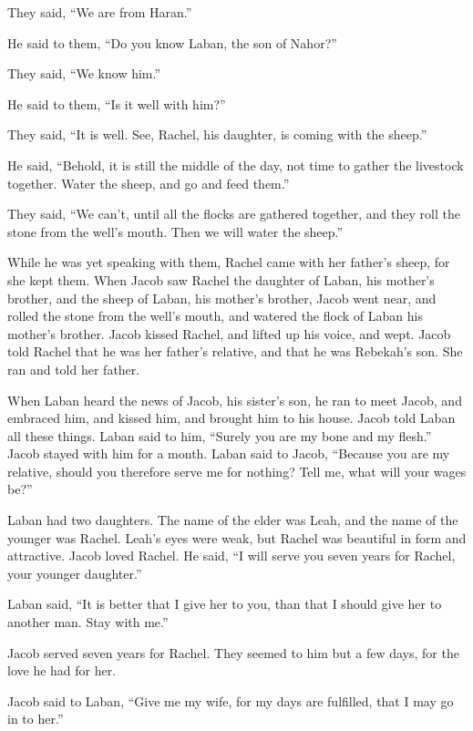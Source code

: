 They said, “We are from Haran.”

\myverse{}He said to them, “Do you know Laban, the son of Nahor?”

They said, “We know him.”

\myverse{}He said to them, “Is it well with him?”

They said, “It is well. See, Rachel, his daughter, is coming with the sheep.”

\myverse{}He said, “Behold, it is still the middle of the day, not time to gather the livestock together. Water the sheep, and go and feed them.”

\myverse{}They said, “We can’t, until all the flocks are gathered together, and they roll the stone from the well’s mouth. Then we will water the sheep.”

\myverse{}While he was yet speaking with them, Rachel came with her father’s sheep, for she kept them.  \myverse{}When Jacob saw Rachel the daughter of Laban, his mother’s brother, and the sheep of Laban, his mother’s brother, Jacob went near, and rolled the stone from the well’s mouth, and watered the flock of Laban his mother’s brother.  \myverse{}Jacob kissed Rachel, and lifted up his voice, and wept.  \myverse{}Jacob told Rachel that he was her father’s relative, and that he was Rebekah’s son. She ran and told her father.

\myverse{}When Laban heard the news of Jacob, his sister’s son, he ran to meet Jacob, and embraced him, and kissed him, and brought him to his house. Jacob told Laban all these things.  \myverse{}Laban said to him, “Surely you are my bone and my flesh.” Jacob stayed with him for a month.  \myverse{}Laban said to Jacob, “Because you are my relative, should you therefore serve me for nothing? Tell me, what will your wages be?”

\myverse{}Laban had two daughters. The name of the elder was Leah, and the name of the younger was Rachel.  \myverse{}Leah’s eyes were weak, but Rachel was beautiful in form and attractive.  \myverse{}Jacob loved Rachel. He said, “I will serve you seven years for Rachel, your younger daughter.”

\myverse{}Laban said, “It is better that I give her to you, than that I should give her to another man. Stay with me.”

\myverse{}Jacob served seven years for Rachel. They seemed to him but a few days, for the love he had for her.

\myverse{}Jacob said to Laban, “Give me my wife, for my days are fulfilled, that I may go in to her.”

